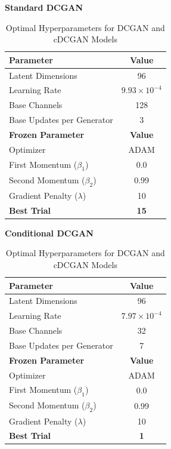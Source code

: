 \documentclass[runningheads]{llncs}
\begin{document}
\begin{table}[H]
    \centering
    \caption{Optimal Hyperparameters for DCGAN and cDCGAN Models}
    \label{tab:best_dcgan_params}
    \begin{minipage}{.48\textwidth}
        \centering
        \textbf{Standard DCGAN} \\[0.5em]
        \begin{tabular}{lc}
        \hline
        \textbf{Parameter} & \textbf{Value} \\
        \hline
        Latent Dimensions & 96 \\
        Learning Rate & $9.93 \times 10^{-4}$ \\
        Base Channels & 128 \\
        Base Updates per Generator & 3 \\
        \hline
        \textbf{Frozen Parameter} & \textbf{Value} \\
        \hline
        Optimizer & ADAM \\
        First Momentum ($\beta_1$) & 0.0 \\
        Second Momentum ($\beta_2$) & 0.99 \\
        Gradient Penalty ($\lambda$) & 10 \\
        \hline
        \textbf{Best Trial} & \textbf{15} \\
        \hline
        \end{tabular}
    \end{minipage}\hfill
    \begin{minipage}{.48\textwidth}
        \centering
        \textbf{Conditional DCGAN} \\[0.5em]
        \begin{tabular}{lc}
        \hline
        \textbf{Parameter} & \textbf{Value} \\
        \hline
        Latent Dimensions & 96 \\
        Learning Rate & $7.97 \times 10^{-4}$ \\
        Base Channels & 32 \\
        Base Updates per Generator & 7 \\
        \hline
        \textbf{Frozen Parameter} & \textbf{Value} \\
        \hline
        Optimizer & ADAM \\
        First Momentum ($\beta_1$) & 0.0 \\
        Second Momentum ($\beta_2$) & 0.99 \\
        Gradient Penalty ($\lambda$) & 10 \\
        \hline
        \textbf{Best Trial} & \textbf{1} \\
        \hline
        \end{tabular}
    \end{minipage}
\end{table}
\end{document}
